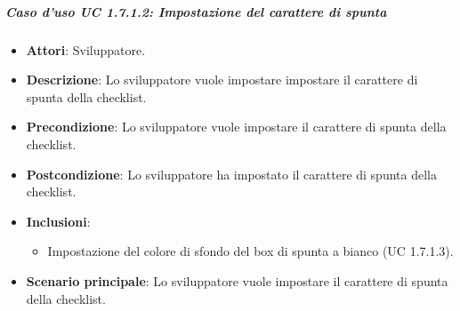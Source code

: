 \subparagraph{Caso d'uso UC 1.7.1.2: Impostazione del carattere di spunta}

\FloatBarrier
\begin{itemize}
\item\textbf{Attori}: Sviluppatore.
\item\textbf{Descrizione}: Lo sviluppatore vuole impostare impostare il carattere di spunta della checklist.
\item\textbf{Precondizione}: Lo sviluppatore vuole impostare il carattere di spunta della checklist.
\item\textbf{Postcondizione}: Lo sviluppatore ha impostato il carattere di spunta della checklist.
\item \textbf{Inclusioni}: 
\begin{itemize}
\item Impostazione del colore di sfondo del box di spunta a bianco (UC 1.7.1.3).
\end{itemize}
\item\textbf{Scenario principale}: Lo sviluppatore vuole impostare il carattere di spunta della checklist.
\end{itemize}